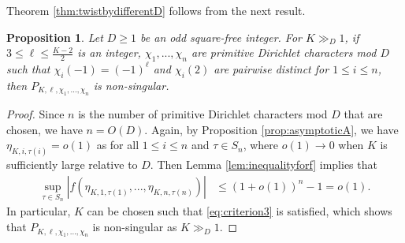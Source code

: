 \documentclass[11pt,letterpaper,reqno]{amsart}
\numberwithin{figure}{section}
\numberwithin{table}{section}
\theoremstyle{definition}
\theoremstyle{plain}
\newtheorem{proposition}[theorem]{Proposition}
\theoremstyle{definition}
\theoremstyle{definition}
\theoremstyle{remark}
\numberwithin{equation}{section}
\theoremstyle{remark}
\begin{document}
Theorem \ref{thm:twistbydifferentD}  follows from the next result.
\begin{proposition}\label{prop:nonsingulartypeiii}
    Let $D\geq1$ be an odd square-free integer. For $K\gg_D1$, if $3\leq\ell\leq\frac{K-2}{2}$ is an integer, $\chi_1,...,\chi_n$ are primitive Dirichlet characters mod $D$ such that $\chi_i(-1)=(-1)^{\ell}$ and $\chi_i(2)$ are pairwise distinct for $1\leq i\leq n$, then $P_{K,\ell,\chi_1,...,\chi_n}$ is non-singular.
\end{proposition}
\begin{proof}
    Since $n$ is the number of primitive Dirichlet characters mod $D$ that are chosen, we have $n=O(D)$.   Again, by Proposition \ref{prop:asymptoticA}, we have $\eta_{K,i,\tau(i)}=o(1)$ as for all $1\leq i\leq n$ and $\tau\in S_n$, where $o(1)\rightarrow0$ when $K$ is sufficiently large relative to $D$. Then Lemma \ref{lem:inequalityforf} implies that
    \begin{align*}
          \sup_{\tau\in S_n}|f(\eta_{K,1,\tau(1)},...,\eta_{K,n,\tau(n)})|&\leq(1+o(1))^n-1=o(1).
    \end{align*}
    In particular, $K$ can be chosen such that \eqref{eq:criterion3} is satisfied, which shows that $P_{K,\ell,\chi_1,...,\chi_n}$ is non-singular as $K\gg_{D}1$.
\end{proof}
\end{document}

